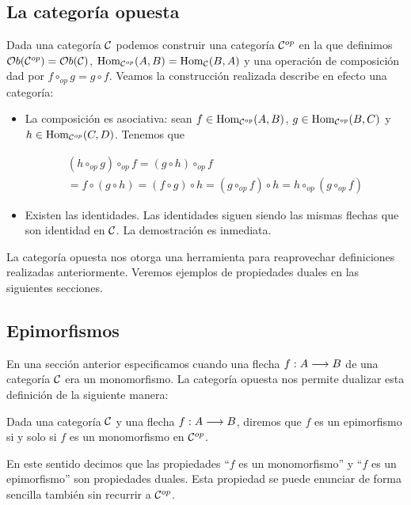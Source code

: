 \subsection{La categoría opuesta}
Dada una categoría $\mathcal{C}$ podemos construir una categoría
$\mathcal{C}^{op}$ en la que definimos $\mathcal{O}b(\mathcal{C}^{op}) = \mathcal{O}b(\mathcal{C})$,
$\operatorname{Hom}_{\mathcal{C}^{op}}(A, B) = \operatorname{Hom}_{\mathcal{C}}(B, A)$ y una operación de
composición dad por $f \circ_{op} g = g \circ f$. Veamos
la construcción realizada describe en efecto una categoría:
\begin{itemize}
\item La composición es asociativa: sean
      $f \in \operatorname{Hom}_{\mathcal{C}^{op}}(A, B)$, $g \in \operatorname{Hom}_{\mathcal{C}^{op}}(B, C)$
      y $h \in \operatorname{Hom}_{\mathcal{C}^{op}}(C, D)$. Tenemos que

\begin{multline*}
(h \circ_{op} g) \circ_{op} f = (g \circ h) \circ_{op} f \\
                              = f \circ (g \circ h)
                              = (f \circ g) \circ h
                              = (g \circ_{op} f)  \circ h
                              = h \circ_{op} (g \circ_{op} f)
\end{multline*}
\item Existen las identidades. Las identidades siguen siendo
      las mismas flechas que son identidad en $\mathcal{C}$. La demostración
      es inmediata.
\end{itemize}

La categoría opuesta nos otorga una herramienta para reaprovechar
definiciones realizadas anteriormente. Veremos ejemplos de propiedades
duales en las siguientes secciones.

\subsection{Epimorfismos}
En una sección anterior especificamos cuando una flecha
$f : A\longrightarrow B$ de una categoría $\mathcal{C}$ era un monomorfismo. La categoría
opuesta nos permite dualizar esta definición de la siguiente manera:

\begin{definition}
Dada una categoría $\mathcal{C}$ y una flecha $f: A\longrightarrow B$, diremos que
$f$ es un epimorfismo si y solo si $f$ es un monomorfismo en
$\mathcal{C}^{op}$.
\end{definition}

En este sentido decimos que las propiedades ``$f$ es un monomorfismo''
y ``$f$ es un epimorfismo'' son propiedades duales. Esta propiedad
se puede enunciar de forma sencilla también sin recurrir a
$\mathcal{C}^{op}$.

